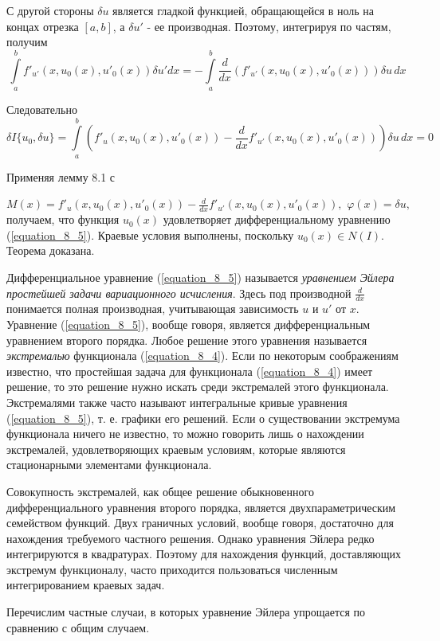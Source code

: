 С другой стороны $\delta u$ является гладкой функцией, обращающейся в ноль на концах отрезка $[a, b]$, а $\delta u'$ - ее производная. Поэтому, интегрируя по частям, получим
$$\textstyle \int\limits_a^b f'_{u'}(x,u_0(x),u'_0(x))\delta u' dx=-\int\limits_a^b \displaystyle{\frac{d}{dx}}(f'_{u'}(x,u_0(x),u'_0(x)))\delta u\,dx$$

Следовательно
$$\textstyle \delta I\{u_0,\delta u\} = \int\limits_a^b (f'_u(x,u_0(x),u'_0(x)) - \displaystyle{\frac{d}{dx}}f'_{u'}(x,u_0(x),u'_0(x)))\delta u\,dx = 0$$

	\newpage
	Применяя \hfill лемму \hfill  8.1 \hfill  с

\noindent
$M(x)=f'_u(x,u_0(x),u'_0(x)) - \displaystyle{\frac{d}{dx}}f'_{u'}(x,u_0(x),u'_0(x)),\,\,\varphi (x)=\delta u,$ получаем, что функция $u_0(x)$ удовлетворяет дифференциальному уравнению (\ref{equation_8_5}). Краевые условия выполнены, поскольку $u_0(x)\in N(I)$. Теорема доказана.

\vspace{3mm}
Дифференциальное уравнение (\ref{equation_8_5}) называется {\it уравнением Эйлера простейшей задачи вариационного исчисления}. Здесь под производной $\displaystyle{\frac{d}{dx}}$  понимается полная производная, учитывающая зависимость $u$ и $u'$ от $x$. Уравнение (\ref{equation_8_5}), вообще говоря, является дифференциальным уравнением второго порядка. Любое решение этого уравнения называется {\it экстремалью} функционала (\ref{equation_8_4}). Если по некоторым соображениям известно, что простейшая задача для функционала (\ref{equation_8_4}) имеет решение, то это решение нужно искать среди экстремалей этого функционала. Экстремалями также часто называют интегральные кривые уравнения (\ref{equation_8_5}), т. е. графики его решений. Если о существовании экстремума функционала ничего не известно, то можно говорить лишь о нахождении экстремалей, удовлетворяющих краевым условиям, которые являются стационарными элементами функционала.

\vspace{3mm}
Совокупность экстремалей, как общее решение обыкновенного дифференциального уравнения второго порядка, является двухпараметрическим семейством функций. Двух граничных условий, вообще говоря, достаточно для нахождения требуемого частного решения. Однако уравнения Эйлера редко интегрируются в квадратурах. Поэтому для нахождения функций, доставляющих экстремум функционалу, часто приходится пользоваться численным интегрированием краевых задач.

\vspace{3mm}
Перечислим частные случаи, в которых уравнение Эйлера упрощается по сравнению с общим случаем.

